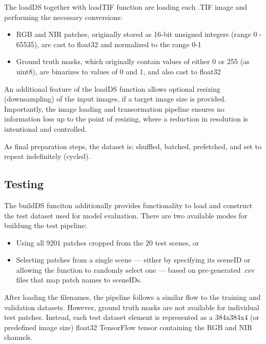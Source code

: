 {The loadDS together with loadTIF function are loading each .TIF image and performing the necessary conversions:

\begin{itemize}
    \item RGB and NIR patches, originally stored as 16-bit unsigned integers (range 0 - 65535), are cast to float32 and normalized to the range 0-1
    \item Ground truth masks, which originally contain values of either 0 or 255 (as uint8), are binarizes to values of 0 and 1, and also cast to float32
\end{itemize}

An additional feature of the loadDS function allows optional resizing (downsampling) of the input images, if a target image size is provided. Importantly, the image loading and transormation pipeline ensures no information loss up to the point of resizing, where a reduction in resolution is intentional and controlled.

As final preparation steps, the dataset is: shuffled, batched, prefetched, and set to repeat indefinitely (cycled).


\subsection{Testing}

The buildDS funciton additionally provides functionality to load and construct the test dataset used for model evaluation. There are two available modes for buildung the test pipeline:

\begin{itemize}
    \item Using all 9201 patches cropped from the 20 test scenes, or
    \item Selecting patches from a single scene --- either by specifying its sceneID or allowing the function to randomly select one --- based on pre-generated .csv files that map patch names to sceneIDs.
\end{itemize}

After loading the filenames, the pipeline follows a similar flow to the training and validation datasets. However, ground truth masks are not available for individual test patches. Instead, each test dataset element is represented as a 384x384x4 (or predefined image size) float32 TensorFlow tensor containing the RGB and NIR channels.

}
